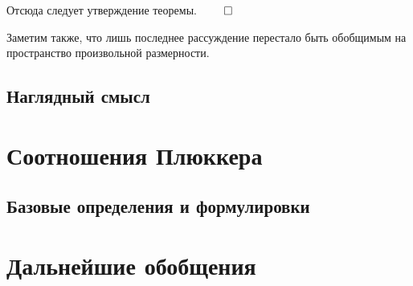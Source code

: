 \documentclass[a4paper, 12pt]{article}
\begin{document}
Отсюда следует утверждение теоремы. $\qed$

Заметим также, что лишь последнее рассуждение перестало быть обобщимым на пространство произвольной размерности.

\subsection{Наглядный смысл} %

\section{Соотношения Плюккера}
\subsection{Базовые определения и формулировки}
\section{Дальнейшие обобщения}
\end{document}
